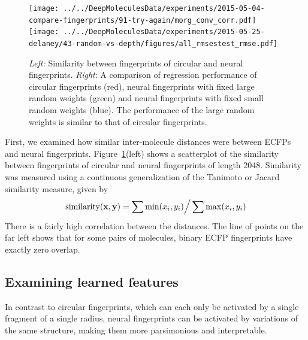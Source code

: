 \documentclass{article}
\newcommand{\vx}{\mathbf{x}}
\newcommand{\vy}{\mathbf{y}}
\begin{document}
\begin{figure}[h]
\centerline{\texttt{[image: ../../DeepMoleculesData/experiments/2015-05-04-compare-fingerprints/91-try-again/morg\_conv\_corr.pdf]}
\texttt{[image: ../../DeepMoleculesData/experiments/2015-05-25-delaney/43-random-vs-depth/figures/all\_rmsestest\_rmse.pdf]}
}
\caption{\emph{Left:} Similarity between fingerprints of circular and neural fingerprints.
\emph{Right}: A comparison of regression performance of circular fingerprints (red), neural fingerprints with fixed large random weights (green) and neural fingerprints with fixed small random weights (blue).
The performance of the large random weights is similar to that of circular fingerprints.
}
\label{fig:fingerprint similarity}
\end{figure}

First, we examined how similar inter-molecule distances were between ECFPs and neural fingerprints.
Figure~\ref{fig:fingerprint similarity}(left) shows a scatterplot of the similarity between fingerprints of circular and neural fingerprints of length 2048.
Similarity was measured using a continuous generalization of the Tanimoto or Jacard similarity measure, given by
\begin{equation}
\textnormal{similarity}(\vx, \vy) =  \sum \min(x_i, y_i) \Big/ \sum \max(x_i, y_i)
\end{equation}
There is a fairly high correlation between the distances.
The line of points on the far left shows that for some pairs of molecules, binary ECFP fingerprints have exactly zero overlap.

\subsection{Examining learned features}
In contrast to circular fingerprints, which can each only be activated by a single fragment of a single radius, neural fingerprints can be activated by variations of the same structure, making them more parsimonious and interpretable.
\end{document}
